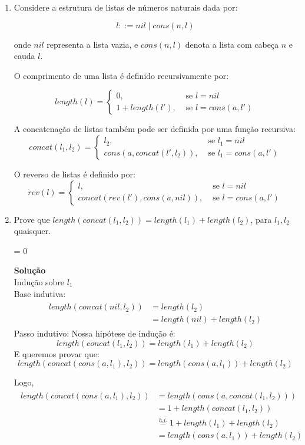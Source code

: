 \documentclass[a4paper]{article}
\newcommand{\answer}[2]{\ifnum#1= 0  {\color{blue} #2}\else \fi}
\begin{document}
\begin{enumerate}
\item Considere a estrutura de listas de números naturais
  dada por:
  
  $$l ::= nil \mid cons(n,l)$$
  
  onde $nil$ representa a lista vazia, e $cons(n,l)$ denota
  a lista com cabeça $n$ e cauda $l$.
  
  O comprimento de uma lista é definido recursivamente por:
  
  $$length(l) =
  \left\{
    \begin{array}{ll}
      0, & \mbox{ se } l = nil \\
      1 + length(l'), & \mbox{ se } l = cons(a,l')
    \end{array}\right.$$
  
  A concatenação de listas também pode ser definida por uma função recursiva:     
  $$concat(l_1,l_2) =
  \left\{
    \begin{array}{ll}
      l_2, & \mbox{ se } l_1 = nil \\
      cons(a, concat(l',l_2)), & \mbox{ se } l_1 = cons(a,l')
    \end{array}\right.$$
  
  O reverso de listas é definido por:
  $$rev(l) =
  \left\{
    \begin{array}{ll}
      l, & \mbox{ se } l = nil \\
      concat(rev(l'), cons( a, nil)), & \mbox{ se } l = cons(a,l')
    \end{array}\right.$$
  
\item Prove que $length(concat(l_1,l_2)) = length(l_1) + length(l_2)$, para $l_1,l_2$ quaisquer.
  
  \answer{0}{ 
    {\bf Solução} \\
    Indução sobre $l_1$\\
    Base indutiva:
    \begin{align*}
      \begin{split}
        length(concat(nil,l_2)) &= length(l_2)\\
        &= length(nil) + length(l_2)
      \end{split}
    \end{align*}
    Passo indutivo: Nossa hipótese de indução é:
    $$ length(concat(l_1,l_2)) = length(l_1) + length(l_2)$$
    E queremos provar que:
    $$ length(concat(cons(a,l_1),l_2)) = length(cons(a,l_1)) + length(l_2)$$
    
    Logo,
    \begin{align*}
      \begin{split}
        length(concat(cons(a,l_1),l_2)) &= length(cons(a,concat(l_1,l_2)))\\
        &= 1 + length(concat(l_1,l_2))\\
        &\stackrel{h.i.}{=} 1 + length(l_1) + length(l_2)\\
        &=length(cons(a,l_1)) + length(l_2)	
      \end{split}
    \end{align*}
  }
  

\end{enumerate}
\end{document}
